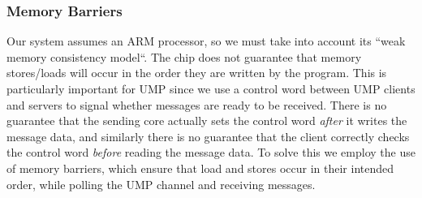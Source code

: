 \subsubsection{Memory Barriers}
Our system assumes an ARM processor, so we must take into account its ``weak memory consistency model``. The chip does not guarantee that memory stores/loads will occur in the order they are written by the program. This is particularly important for UMP since we use a control word between UMP clients and servers to signal whether messages are ready to be received. There is no guarantee that the sending core actually sets the control word \textit{after} it writes the message data, and similarly there is no guarantee that the client correctly checks the control word \textit{before} reading the message data. To solve this we employ the use of memory barriers, which ensure that load and stores occur in their intended order, while polling the UMP channel and receiving messages.


